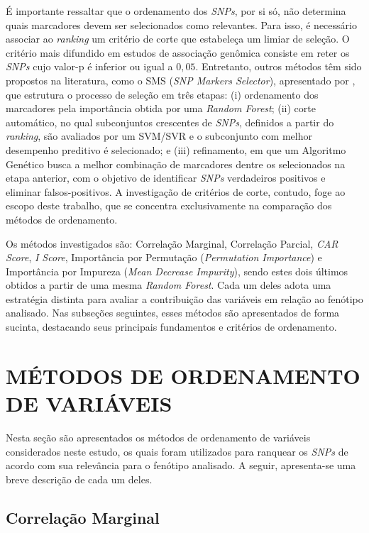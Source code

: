 \documentclass[12pt,fleqn]{article}
\newcommand{\citeonline}[1]{\citet{#1}}
\begin{document}
É importante ressaltar que o ordenamento dos \emph{SNPs}, por si só, não determina quais marcadores devem ser selecionados como relevantes. Para isso, é necessário associar ao \emph{ranking} um critério de corte que estabeleça um limiar de seleção. O critério mais difundido em estudos de associação genômica consiste em reter os \emph{SNPs} cujo valor-p é inferior ou igual a $0{,}05$. Entretanto, outros métodos têm sido propostos na literatura, como o SMS (\emph{SNP Markers Selector}), apresentado por \citeonline{Oliveira2015}, que estrutura o processo de seleção em três etapas: (i) ordenamento dos marcadores pela importância obtida por uma \emph{Random Forest}; (ii) corte automático, no qual subconjuntos crescentes de \emph{SNPs}, definidos a partir do \emph{ranking}, são avaliados por um SVM/SVR e o subconjunto com melhor desempenho preditivo é selecionado; e (iii) refinamento, em que um Algoritmo Genético busca a melhor combinação de marcadores dentre os selecionados na etapa anterior, com o objetivo de identificar \emph{SNPs} verdadeiros positivos e eliminar falsos-positivos. A investigação de critérios de corte, contudo, foge ao escopo deste trabalho, que se concentra exclusivamente na comparação dos métodos de ordenamento.

Os métodos investigados são: Correlação Marginal, Correlação Parcial, \emph{CAR Score}, \emph{I Score}, Importância por Permutação (\emph{Permutation Importance}) e Importância por Impureza (\emph{Mean Decrease Impurity}), sendo estes dois últimos obtidos a partir de uma mesma \emph{Random Forest}. Cada um deles adota uma estratégia distinta para avaliar a contribuição das variáveis em relação ao fenótipo analisado. Nas subseções seguintes, esses métodos são apresentados de forma sucinta, destacando seus principais fundamentos e critérios de ordenamento.

\section{MÉTODOS DE ORDENAMENTO DE VARIÁVEIS}

Nesta seção são apresentados os métodos de ordenamento de variáveis considerados neste estudo, os quais foram utilizados para ranquear os \emph{SNPs} de acordo com sua relevância para o fenótipo analisado. A seguir, apresenta-se uma breve descrição de cada um deles.

\subsection{Correlação Marginal}
\end{document}
